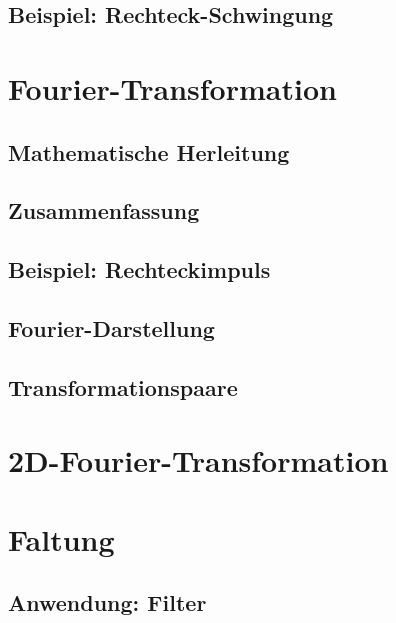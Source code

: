 \documentclass[a4paper, 11pt, accentcolor = tud3b]{tudreport}
\begin{document}
			\subsection{Beispiel: Rechteck-Schwingung} %

		\section{Fourier-Transformation} %

			\subsection{Mathematische Herleitung} %

			\subsection{Zusammenfassung} %

			\subsection{Beispiel: Rechteckimpuls} %

			\subsection{Fourier-Darstellung} %

			\subsection{Transformationspaare} %

		\section{2D-Fourier-Transformation} %

		\section{Faltung} %

			\subsection{Anwendung: Filter} %
\end{document}
